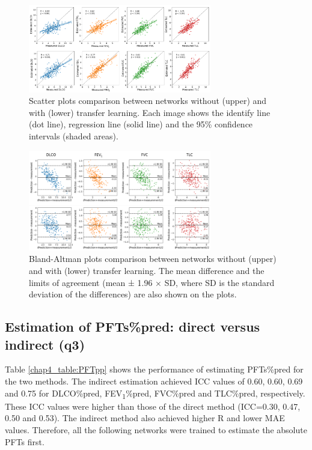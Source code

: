 \begin{figure}[tb]
    \centering
    \includegraphics[width=8cm]{scatter.png}
    \caption{Scatter plots comparison between networks without (upper) and with (lower) transfer learning. Each image shows the identify line (dot line), regression line (solid line) and the 95\% confidence intervals (shaded areas).}
    \label{fig:chap4_scatter}
\end{figure}


\begin{figure}[tb]
    \centering
    \includegraphics[width=8cm]{ba.png}
    \caption{Bland-Altman plots comparison between networks without (upper) and with (lower) transfer learning. The mean difference and the limits of agreement (mean ± 1.96 × SD, where SD is the standard deviation of the differences) are also shown on the plots.}
    \label{fig:chap4_ba}
\end{figure}


\subsection{Estimation of PFTs\%pred: direct versus indirect (q3)}

Table \ref{chap4_table:PFTpp} shows the performance of estimating PFTs\%pred for the two methods. The indirect estimation achieved ICC values of 0.60, 0.60, 0.69 and 0.75 for DLCO\%pred, FEV\textsubscript{1}\%pred, FVC\%pred and TLC\%pred, respectively. These ICC values were higher than those of the direct method (ICC=0.30, 0.47, 0.50 and 0.53). The indirect method also achieved higher R and lower MAE values. Therefore, all the following networks were trained to estimate the absolute PFTs first. 


